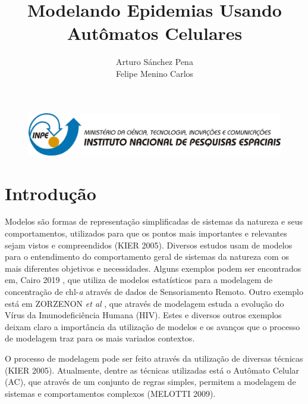 \documentclass[a4paper,12pt]{article}
\begin{document}
\begin{figure}
 \begin{center}
  \includegraphics[width=1\linewidth]{fig/logoinpe.png}
 \end{center}
\end{figure}

\setlength{\textfloatsep}{0pt}

\title{Modelando Epidemias Usando Autômatos Celulares}
    
\author{Arturo Sánchez Pena \\ Felipe Menino Carlos}
\date{}

\maketitle

\section{Introdução}

Modelos são formas de representação simplificadas de sistemas da natureza e seus comportamentos, utilizados para que os pontos mais importantes e relevantes sejam vistos e compreendidos (KIER 2005\cite{Kier2005}). Diversos estudos usam de modelos para o entendimento do comportamento geral de sistemas da natureza com os mais diferentes objetivos e necessidades. Alguns exemplos podem ser encontrados em, Cairo 2019 \cite{Cairo2019}, que utiliza de modelos estatísticos para a modelagem de concentração de chl-\textit{a} através de dados de Sensoriamento Remoto. Outro exemplo está em ZORZENON \textit{et al} \cite{ZorzenonDosSantos2001}, que através de modelagem estuda a evolução do Vírus da Imunodeficiência Humana (HIV). Estes e diversos outros exemplos deixam claro a importância da utilização de modelos e os avanços que o processo de modelagem traz para os mais variados contextos.

O processo de modelagem pode ser feito através da utilização de diversas técnicas (KIER 2005\cite{Kier2005}). Atualmente, dentre as técnicas utilizadas está o Autômato Celular (AC), que através de um conjunto de regras simples, permitem a modelagem de sistemas e comportamentos complexos (MELOTTI 2009\cite{Melotti2009}).
\end{document}
